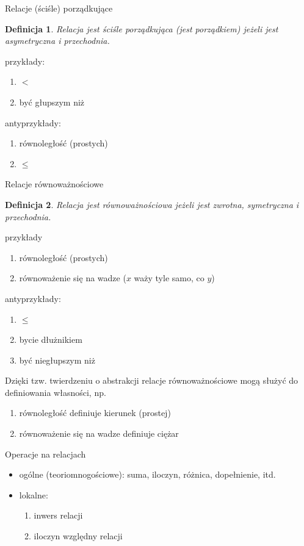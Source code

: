 \documentclass{beamer}
\newtheorem{definicja}{Definicja}
\begin{document}
\begin{frame}{Relacje (ściśle) porządkujące}
%
\begin{definicja}
Relacja jest ściśle porządkująca (jest porządkiem) jeżeli jest asymetryczna i przechodnia.
\end{definicja}
%
przykłady:
\begin{enumerate}
\item $<$
\item być głupszym niż
\end{enumerate}
%
antyprzykłady:
\begin{enumerate}
\item równoległość (prostych)
\item $\leq$
\end{enumerate}
\end{frame}

\begin{frame}{Relacje równoważnościowe}
%
\begin{definicja}
Relacja jest równoważnościowa jeżeli jest zwrotna, symetryczna i przechodnia.
\end{definicja}
%
przykłady
\begin{enumerate}
\item równoległość (prostych)
\item równoważenie się na wadze ($x$ waży tyle samo, co $y$)
\end{enumerate}
%
antyprzykłady:
\begin{enumerate}
\item $\leq$
\item bycie dłużnikiem
\item być niegłupszym niż
\end{enumerate}
%
Dzięki tzw. twierdzeniu o abstrakcji relacje równoważnościowe mogą służyć do definiowania własności, np.
\begin{enumerate}
\item równoległość definiuje kierunek (prostej)
\item równoważenie się na wadze definiuje ciężar
\end{enumerate}
\end{frame}

\begin{frame}{Operacje na relacjach}
%
\begin{itemize}
	\item ogólne (teoriomnogościowe): suma, iloczyn, różnica, dopełnienie, itd.
	\item lokalne:
	\begin{enumerate}
		\item inwers relacji
		\item iloczyn względny relacji
	\end{enumerate}
\end{itemize}
\end{frame}
\end{document}
